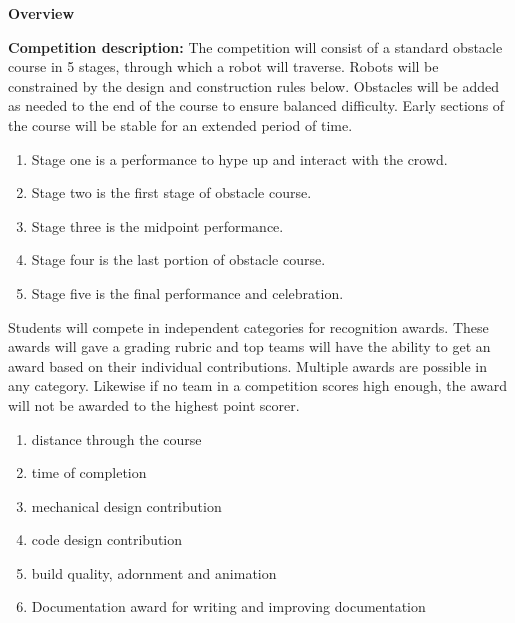 \documentclass{article}
\begin{document}
{\huge \textbf{Overview}}
\vspace{1cm}

\textbf{Competition description:} The competition will consist of a standard obstacle course in 5 stages, through which a robot will traverse. Robots will be constrained by the design and construction rules below. Obstacles will be added as needed to the end of the course to ensure balanced difficulty. Early sections of the course will be stable for an extended period of time. 
\begin{enumerate}
\item Stage one is a performance to hype up and interact with the crowd.

\item Stage two is the first stage of obstacle course. 

\item Stage three is the midpoint performance.

\item Stage four is the last portion of obstacle course. 

\item Stage five is the final performance and celebration. 
\end{enumerate}

Students will compete in independent categories for recognition awards. These awards will gave a grading rubric and top teams will have the ability to get an award based on their individual contributions. Multiple awards are possible in any category. Likewise if no team in a competition scores high enough, the award will not be awarded to the highest point scorer. 

\begin{enumerate}
	
\item distance through the course
 
\item  time of completion
 
\item  mechanical design contribution
 
\item  code design contribution
 
 \item build quality, adornment and animation
 
 \item Documentation award for writing and improving documentation
 
\end{enumerate}
\end{document}
